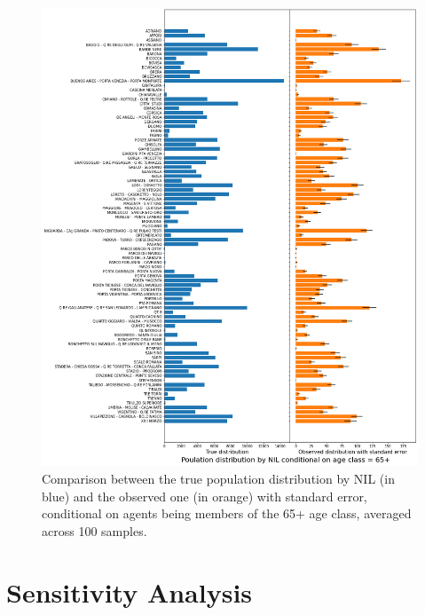 \begin{figure}[H]
    \centering
    \includegraphics[scale = 0.45]{tex/pics/pop_by_nil_65.png}
    \caption{Comparison between the true population distribution by NIL (in blue) and the observed one (in orange) with standard error, conditional on agents being members of the 65+ age class, averaged across 100 samples.}
    \label{pop_nil_65}
\end{figure}

\section{Sensitivity Analysis} \label{app_sa}

